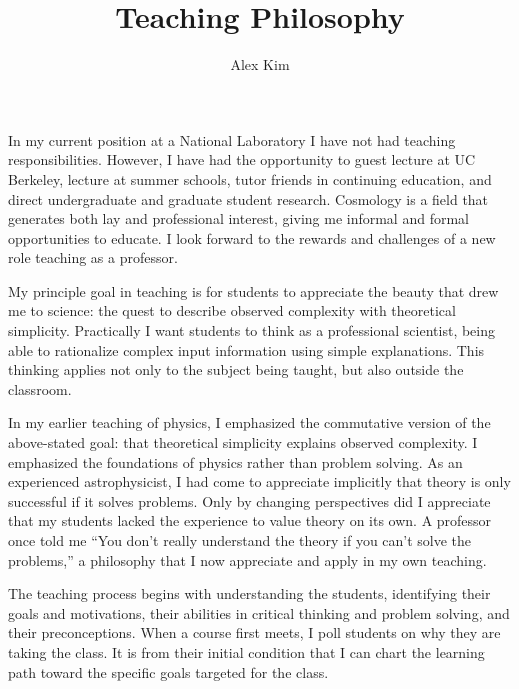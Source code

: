 \documentclass{article}
\date{}
\begin{document}
\title{Teaching Philosophy}
\author{Alex Kim}
\maketitle

In my current position at a National Laboratory I have not had teaching responsibilities.  However,
I have had the opportunity to guest lecture at UC Berkeley, lecture at summer schools, tutor friends
in continuing education, and direct undergraduate and graduate student research.  Cosmology
is a field that generates both lay and professional interest, giving me informal and formal opportunities to
educate.  I look forward to the rewards and challenges of a new role teaching as a professor. 

My principle goal in teaching is for students to appreciate the beauty that drew me to science: the quest to
describe  observed complexity with
theoretical simplicity.  Practically I want students to think as a professional scientist, being able to 
rationalize complex input information using simple explanations.
This thinking applies not only to the subject being taught,  but also
outside the classroom.

In my earlier teaching of physics,  I emphasized the commutative version
of the above-stated goal: that theoretical simplicity explains observed complexity.  I  emphasized the foundations of physics
rather than problem solving. As an experienced astrophysicist, I had come to
appreciate implicitly that theory is only successful if it solves problems.  Only by changing perspectives
did I appreciate that my students lacked the experience
to value theory on its own.  A  professor once told me
``You don't really understand the theory if you can't solve the problems,'' a philosophy that I now  appreciate and
apply in my own teaching.


The teaching process  begins with understanding the students, identifying their goals and motivations, their abilities in critical thinking and
problem solving, and their preconceptions.  When a course first meets, I poll students on why they are taking the
class.  It is from their initial condition that I can chart the learning path toward the specific goals targeted
for the class. 
\end{document}
